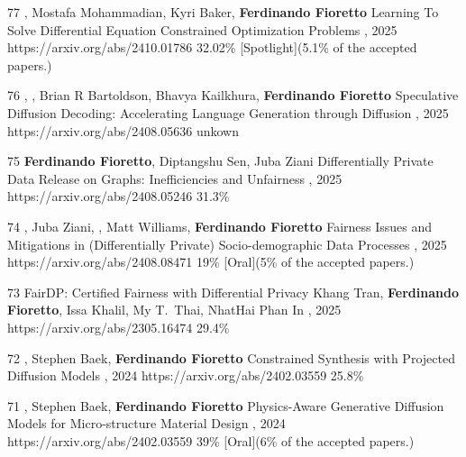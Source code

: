\begin{pubs}


\confentryAwd
	{77}
	{, Mostafa Mohammadian, Kyri Baker, {\bf Ferdinando Fioretto}}
	{Learning To Solve Differential Equation Constrained Optimization Problems}
	{\procICLR, 2025}
	{https://arxiv.org/abs/2410.01786}
	{32.02\%} %
	{[Spotlight]}{(5.1\% of the accepted papers.)}

\confentry
	{76}
	{, , Brian R Bartoldson, Bhavya Kailkhura, {\bf Ferdinando Fioretto}}
	{Speculative Diffusion Decoding: Accelerating Language Generation through Diffusion}
	{\procNAACL, 2025}
	{https://arxiv.org/abs/2408.05636}
	{unkown}

\confentry
	{75}
	{{\bf Ferdinando Fioretto}, Diptangshu Sen, Juba Ziani}
	{Differentially Private Data Release on Graphs: Inefficiencies and Unfairness}
	{\procAISTATS, 2025}
	{https://arxiv.org/abs/2408.05246}
	{31.3\%} %

\confentryAwd
	{74}
	{, Juba Ziani, , Matt Williams, {\bf Ferdinando Fioretto}}
	{Fairness Issues and Mitigations in (Differentially Private) Socio-demographic Data Processes}
	{\procAAAI, 2025}
	{https://arxiv.org/abs/2408.08471}
	{19\%} %
	{[Oral]}{(5\% of the accepted papers.)}

\confentry
	{73}
	{FairDP: Certified Fairness with Differential Privacy}
	{Khang Tran, {\bf Ferdinando Fioretto}, Issa Khalil, My T.~Thai, NhatHai Phan}
	{In , 2025}
	{https://arxiv.org/abs/2305.16474}
	{29.4\%}%


\confentry
	{72}
	{, Stephen Baek, {\bf Ferdinando Fioretto}}
  	{Constrained Synthesis with Projected Diffusion Models}
  	{\procNeurIPS, 2024}
	{https://arxiv.org/abs/2402.03559}
	{25.8\%}

\confentryAwd
	{71}
	{, Stephen Baek, {\bf Ferdinando Fioretto}}
  	{Physics-Aware Generative Diffusion Models for Micro-structure Material Design}
  	{, 2024}
	{https://arxiv.org/abs/2402.03559}
	{39\%}
	{[Oral]}{(6\% of the accepted papers.)}


\end{pubs}

